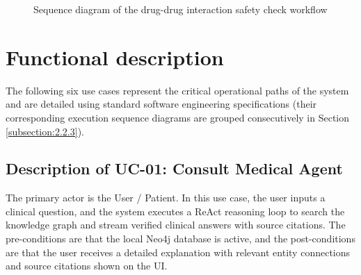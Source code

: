 \documentclass[../main.tex]{subfiles}
\begin{document}
\begin{figure}[H]
{%
}
\caption{Sequence diagram of the drug-drug interaction safety check workflow}
\label{fig:pill_interaction_sequence}
\end{figure}



\section{Functional description}
\label{section:2.3}
The following six use cases represent the critical operational paths of the system and are detailed using standard software engineering specifications (their corresponding execution sequence diagrams are grouped consecutively in Section \ref{subsection:2.2.3}).

\subsection{Description of UC-01: Consult Medical Agent}
The primary actor is the User / Patient. In this use case, the user inputs a clinical question, and the system executes a ReAct reasoning loop to search the knowledge graph and stream verified clinical answers with source citations. The pre-conditions are that the local Neo4j database is active, and the post-conditions are that the user receives a detailed explanation with relevant entity connections and source citations shown on the UI.
\end{document}
